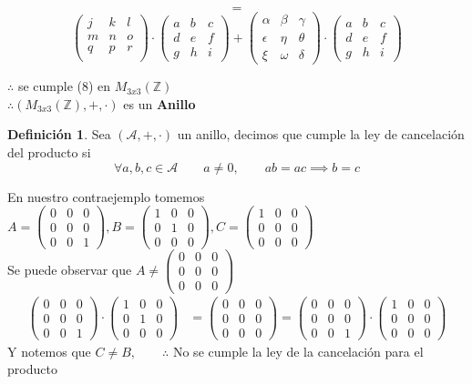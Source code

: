 \documentclass[letterpaper]{article}
\newcommand{\A}{\mathcal{A}}
\newcommand{\Ceros}{\begin{pmatrix}
		0 & 0 & 0\\
		0 & 0 & 0\\
		0 & 0 & 0 
\end{pmatrix}}
\newcommand{\Nmat}{\begin{pmatrix}
		j & k & l\\
		m & n & o\\
		q & p & r\\
\end{pmatrix}}
\newcommand{\Pmat}{\begin{pmatrix}
		\alpha & \beta & \gamma\\
		\epsilon & \eta & \theta\\
		\xi & \omega & \delta
\end{pmatrix}}
\newcommand{\Mmat}{\begin{pmatrix}
		a & b & c\\
		d & e & f\\
		g & h & i
\end{pmatrix}}
\newcommand{\mtt}{M_{3x3}(\mathds{Z})}
\renewcommand{\*}{\cdot}
\theoremstyle{definition}
\newtheorem{definition}{Definición}
\begin{document}
$$ =$$
$$
\Nmat \* \Mmat + \Pmat \* \Mmat 
$$
\begin{center}
	$ \therefore $ se cumple (8) en $ \mtt $\\
	
	$ \therefore (\mtt, +, \*) $ es un \textbf{Anillo}
\end{center}
\begin{definition}
	Sea $ (\A, +, \*) $ un anillo, decimos que cumple la ley de cancelación del producto si
	\[ \forall a,b,c \in  \A \qquad a \neq 0, \qquad ab = ac \implies b = c \]
\end{definition}	
En nuestro contraejemplo tomemos $ A = \begin{pmatrix}
0 & 0 & 0\\
0 & 0 & 0\\
0 & 0 & 1
\end{pmatrix},
B = \begin{pmatrix}
1 & 0 & 0 \\
0 & 1 & 0 \\
0 & 0 & 0 
\end{pmatrix}, C = \begin{pmatrix}
1 & 0 & 0 \\
0 & 0 & 0 \\
0 & 0 & 0 
\end{pmatrix} 
$
\\Se puede observar que $ A \neq \Ceros $
\begin{align*}
	\begin{pmatrix}
	0 & 0 & 0\\
	0 & 0 & 0\\
	0 & 0 & 1
	\end{pmatrix} \* \begin{pmatrix}
	1 & 0 & 0 \\
	0 & 1 & 0 \\
	0 & 0 & 0 
	\end{pmatrix} & = \Ceros =
	\begin{pmatrix}
	0 & 0 & 0\\
	0 & 0 & 0\\
	0 & 0 & 1
	\end{pmatrix} \* \begin{pmatrix}
	1 & 0 & 0 \\
	0 & 0 & 0 \\
	0 & 0 & 0 
	\end{pmatrix} 
\end{align*}
Y notemos que $ C \neq B, \qquad \therefore $ No se cumple la ley de la cancelación para el producto
\end{document}
